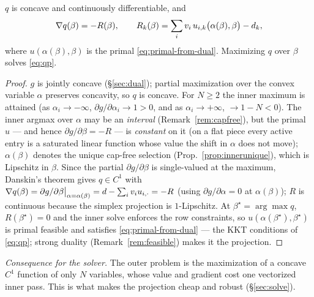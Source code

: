 \documentclass[11pt,a4paper]{article}
\begin{document}
\begin{prop}[$q$ is concave, $C^1$, with $\grad q=-R$]
\label{prop:q}
$q$ is concave and continuously differentiable, and
\begin{equation}
  \nabla q(\beta)=-R(\beta),\qquad R_k(\beta)=\sum_i v_i\,u_{i,k}\bigl(\alpha(\beta),\beta\bigr)-d_k ,
  \label{eq:gradq}
\end{equation}
where $u(\alpha(\beta),\beta)$ is the primal \eqref{eq:primal-from-dual}. Maximizing $q$ over
$\beta$ solves \eqref{eq:qp}.
\end{prop}
\begin{proof}
$g$ is jointly concave (\S\ref{sec:dual}); partial maximization over the convex variable
$\alpha$ preserves concavity, so $q$ is concave. For $N\ge2$ the inner maximum is attained
(as $\alpha_i\to-\infty$, $\partial g/\partial\alpha_i\to1>0$, and as $\alpha_i\to+\infty$,
$\to1-N<0$). The inner argmax over $\alpha$ may be an \emph{interval} (Remark~\ref{rem:capfree}),
but the primal $u$ --- and hence $\partial g/\partial\beta=-R$ --- is \emph{constant} on it
(on a flat piece every active entry is a saturated linear function whose value the shift in
$\alpha$ does not move); $\alpha(\beta)$ denotes the unique cap-free selection
(Prop.~\ref{prop:innerunique}), which is Lipschitz in $\beta$. Since the partial
$\partial g/\partial\beta$ is single-valued at the maximum, Danskin's theorem
\cite{bertsekas1999nonlinear} gives $q\in C^1$ with $\nabla q(\beta)=\partial g/\partial\beta
\big|_{\alpha=\alpha(\beta)}=d-\sum_i v_i u_{i,\cdot}=-R$ (using $\partial g/\partial\alpha=0$
at $\alpha(\beta)$); $R$ is continuous because the simplex projection is $1$-Lipschitz. At
$\beta^\star=\arg\max q$, $R(\beta^\star)=0$ and the inner solve enforces the row constraints,
so $u(\alpha(\beta^\star),\beta^\star)$ is primal feasible and satisfies
\eqref{eq:primal-from-dual} --- the KKT conditions of \eqref{eq:qp}; strong duality
(Remark~\ref{rem:feasible}) makes it the projection.
\end{proof}

\emph{Consequence for the solver.} The outer problem is the maximization of a concave $C^1$
function of only $N$ variables, whose value and gradient cost one vectorized inner pass. This
is what makes the projection cheap and robust (\S\ref{sec:solve}).

\end{document}
